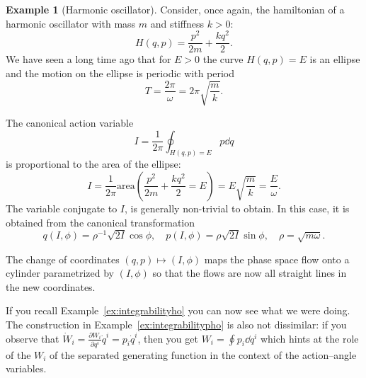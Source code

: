 \documentclass[english,fontsize=11pt,paper=b5]{scrbook}
\numberwithin{equation}{chapter}
\theoremstyle{definition}
\newtheorem{example}{Example}[chapter]
\begin{document}
      \begin{example}[Harmonic oscillator]
        Consider, once again, the hamiltonian of a harmonic oscillator with mass $m$ and stiffness $k>0$:
        \begin{equation}
          H(q,p) = \frac{p^2}{2m} + \frac{k q^2}{2}.
        \end{equation}
        We have seen a long time ago that for $E>0$ the curve $H(q,p) = E$ is an ellipse and the motion on the ellipse is periodic with period
        \begin{equation}
          T = \frac{2\pi}{\omega} = 2\pi \sqrt{\frac{m}{k}}.
        \end{equation}

        The canonical action variable
        \begin{equation}
          I = \frac1{2\pi}\oint_{H(q,p) = E} p \dd q
        \end{equation}
        is proportional to the area of the ellipse:
        \begin{equation}
          I = \frac1{2\pi} \mathrm{area}\left(\frac{p^2}{2m} + \frac{k q^2}{2} = E\right) = E \sqrt{\frac{m}{k}} = \frac E \omega.
        \end{equation}
        The variable conjugate to $I$, is generally non-trivial to obtain. In this case, it is obtained from the canonical transformation
        \begin{equation}
          q(I, \phi) = \rho^{-1} \sqrt{2I} \cos\phi, \quad
          p(I, \phi) = \rho \sqrt{2I} \sin\phi, \quad
          \rho = \sqrt{m \omega}.
        \end{equation}

        The change of coordinates $(q,p) \mapsto (I, \phi)$ maps the phase space flow onto a cylinder parametrized by $(I, \phi)$ so that the flows are now all straight lines in the new coordinates.

        If you recall Example~\ref{ex:integrabilityho} you can now see what we were doing.
        The construction in Example~\ref{ex:integrabilitypho} is also not dissimilar: if you observe that $\dot W_i = \frac{\partial W_i}{\partial q^i} \dot q^i = p_i \dot q^i$, then you get $W_i = \oint p_i\dd q^i$ which hints at the role of the $W_i$ of the separated generating function in the context of the action--angle variables.
      \end{example}
\end{document}
